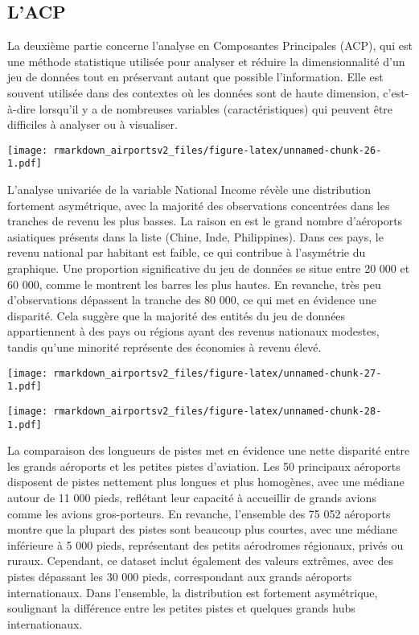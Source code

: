 \documentclass[
]{compterendu}
\begin{document}
\subsection{L'ACP}\label{lacp}

La deuxième partie concerne l'analyse en Composantes Principales (ACP),
qui est une méthode statistique utilisée pour analyser et réduire la
dimensionnalité d'un jeu de données tout en préservant autant que
possible l'information. Elle est souvent utilisée dans des contextes où
les données sont de haute dimension, c'est-à-dire lorsqu'il y a de
nombreuses variables (caractéristiques) qui peuvent être difficiles à
analyser ou à visualiser.

\texttt{[image: rmarkdown\_airportsv2\_files/figure-latex/unnamed-chunk-26-1.pdf]}

L'analyse univariée de la variable National Income révèle une
distribution fortement asymétrique, avec la majorité des observations
concentrées dans les tranches de revenu les plus basses. La raison en
est le grand nombre d'aéroports asiatiques présents dans la liste
(Chine, Inde, Philippines). Dans ces pays, le revenu national par
habitant est faible, ce qui contribue à l'asymétrie du graphique. Une
proportion significative du jeu de données se situe entre 20 000 et 60
000, comme le montrent les barres les plus hautes. En revanche, très peu
d'observations dépassent la tranche des 80 000, ce qui met en évidence
une disparité. Cela suggère que la majorité des entités du jeu de
données appartiennent à des pays ou régions ayant des revenus nationaux
modestes, tandis qu'une minorité représente des économies à revenu
élevé.

\texttt{[image: rmarkdown\_airportsv2\_files/figure-latex/unnamed-chunk-27-1.pdf]}

\texttt{[image: rmarkdown\_airportsv2\_files/figure-latex/unnamed-chunk-28-1.pdf]}

La comparaison des longueurs de pistes met en évidence une nette
disparité entre les grands aéroports et les petites pistes d'aviation.
Les 50 principaux aéroports disposent de pistes nettement plus longues
et plus homogènes, avec une médiane autour de 11 000 pieds, reflétant
leur capacité à accueillir de grands avions comme les avions
gros-porteurs. En revanche, l'ensemble des 75 052 aéroports montre que
la plupart des pistes sont beaucoup plus courtes, avec une médiane
inférieure à 5 000 pieds, représentant des petits aérodromes régionaux,
privés ou ruraux. Cependant, ce dataset inclut également des valeurs
extrêmes, avec des pistes dépassant les 30 000 pieds, correspondant aux
grands aéroports internationaux. Dans l'ensemble, la distribution est
fortement asymétrique, soulignant la différence entre les petites pistes
et quelques grands hubs internationaux.
\end{document}
